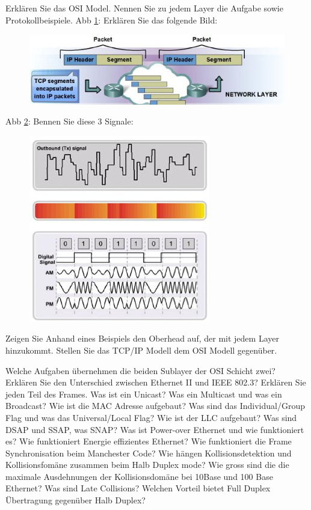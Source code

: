 \documentclass[ngerman,a4paper,12pt]{scrreprt}
\begin{document}
	\li Erklären Sie das OSI Model. Nennen Sie zu jedem Layer die Aufgabe sowie Protokollbeispiele.
	\li Abb \ref{tcp}: Erklären Sie das folgende Bild:  	
		\begin{figure}[H]
			\centering
			\caption{}
			\includegraphics[scale=0.60]{img/R1.3.jpg}
			\label{tcp}
		\end{figure}	
	\li Abb \ref{signals}: Bennen Sie diese 3 Signale: 	
		\begin{figure}[H]
			\centering
			\caption{}
			\includegraphics[scale=0.60]{img/R1.4.jpg}
			\label{signals}
		\end{figure} 
	\li Zeigen Sie Anhand eines Beispiels den Oberhead auf, der mit jedem Layer hinzukommt.
	\li Stellen Sie das TCP/IP Modell dem OSI Modell gegenüber.
\olS


\olR
	\li Welche Aufgaben übernehmen die beiden Sublayer der OSI Schicht zwei?
	\li Erklären Sie den Unterschied zwischen Ethernet II und IEEE 802.3? Erklären Sie jeden Teil des Frames.
	\li Was ist ein Unicast? Was ein Multicast und was ein Broadcast?
	\li Wie ist die MAC Adresse aufgebaut? Was sind das Individual/Group Flag und was das Universal/Local Flag?
	\li Wie ist der LLC aufgebaut? Was sind DSAP und SSAP, was SNAP?
	\li Was ist Power-over Ethernet und wie funktioniert es?
	\li Wie funktioniert Energie effizientes Ethernet?
	\li Wie funktioniert die Frame Synchronisation beim Manchester Code?
	\li Wie hängen Kollisionsdetektion und Kollisionsfomäne zusammen beim Halb Duplex mode?
	\li Wie gross sind die die maximale Ausdehnungen der Kollisionsdomäne bei 10Base und 100 Base Ethernet? Was sind Late Collisions?
	\li Welchen Vorteil bietet Full Duplex Übertragung gegenüber Halb Duplex?
\olS
\end{document}
